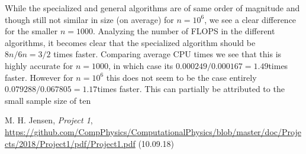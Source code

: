 \documentclass{emulateapj}
\begin{document}
While the specialized and general algorithms are of same order of magnitude and though still not similar in size (on average) for $n = 10^{6}$, we see a clear difference for the smaller $n = 1000$. Analyzing the number of FLOPS in the different algorithms, it becomes clear that the specialized algorithm should be $8n/6n = 3/2$ times faster. Comparing average CPU times we see that this is highly accurate for $n=1000$, in which case its $0.000249/0.000167 = 1.49$times faster. However for $n = 10^{6}$ this does not seem to be the case entirely $0.079288/0.067805 = 1.17$times faster. This can partially be attributed to the small sample size of ten




%
%






\begin{acknowledgements}

\end{acknowledgements}

\begin{thebibliography}{}

  M. H. Jensen,
  \textit{Project 1},
  \url{https://github.com/CompPhysics/ComputationalPhysics/blob/master/doc/Projects/2018/Project1/pdf/Project1.pdf} (10.09.18)

\end{thebibliography}
\end{document}
